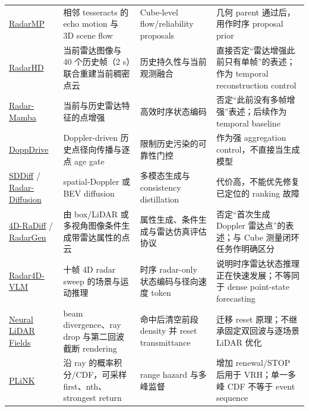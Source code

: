 \documentclass[11pt,a4paper,fontset=none]{ctexart}
\begin{document}
\begin{longtable}{p{2.7cm} p{4.1cm} p{4.4cm} p{3.5cm}}
\href{https://arxiv.org/abs/2511.12117}{RadarMP} &
相邻 tesseracts 的 echo motion 与 3D scene flow &
Cube-level flow/reliability proposals &
几何 parent 通过后，用作时序 proposal prior \\

\href{https://arxiv.org/abs/2206.09273}{RadarHD} &
当前雷达图像与 40 个历史帧（2 s）联合重建当前稠密点云 &
历史持久性与当前观测融合 &
直接否定“雷达增强此前只有单帧”的表述；作为 temporal reconstruction control \\

\href{https://palm.seu.edu.cn/zhangml/files/MM\%2725.pdf}{Radar-Mamba} &
当前与历史雷达特征的点增强 &
高效时序状态编码 &
否定“此前没有多帧增强”表述；后续作为 temporal baseline \\

\href{https://arxiv.org/abs/2508.12330}{DoppDrive} &
Doppler-driven 历史点径向传播与逐点 age gate &
限制历史污染的可靠性门控 &
作为强 aggregation control，不直接当生成模型 \\

\href{https://www.ijcai.org/proceedings/2025/979}{SDDiff} /
\href{https://arxiv.org/abs/2403.08460}{Radar-Diffusion} &
spatial-Doppler 或 BEV diffusion &
多模态生成与 consistency distillation &
代价高，不能优先修复已定位的 ranking 故障 \\

\href{https://arxiv.org/abs/2512.14235}{4D-RaDiff} /
\href{https://arxiv.org/abs/2512.17897}{RadarGen} &
由 box/LiDAR 或多视角图像条件生成带雷达属性的点云 &
属性生成、条件生成与雷达仿真评估协议 &
否定“首次生成 Doppler 雷达点”的表述；与 Cube 测量闭环任务作明确区分 \\

\href{https://arxiv.org/abs/2608.04130}{Radar4D-VLM} &
十帧 4D radar sweep 的场景与运动推理 &
时序 radar-only 状态编码与径向速度 token &
说明时序雷达状态推理正在快速发展；不等同于 dense point-state forecasting \\

\href{https://openaccess.thecvf.com/content/ICCV2023/papers/Huang_Neural_LiDAR_Fields_for_Novel_View_Synthesis_ICCV_2023_paper.pdf}{Neural LiDAR Fields} &
beam divergence、ray drop 与第二回波截断 rendering &
命中后清空前段 density 并 reset transmittance &
迁移 reset 原理；不继承固定双回波与逐场景 LiDAR 优化 \\

\href{https://arxiv.org/abs/2411.01725}{PLiNK} &
沿 ray 的概率积分/CDF，可采样 first、nth、strongest return &
range hazard 与多峰监督 &
增加 renewal/STOP 后用于 VRH；单一多峰 CDF 不等于 event sequence \\


\end{longtable}
\end{document}
